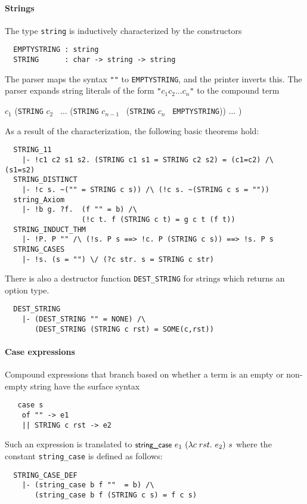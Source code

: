 \paragraph {Strings}

The type \verb+string+ is inductively characterized by the
constructors
%
{\small
\begin{verbatim}
  EMPTYSTRING : string
  STRING      : char -> string -> string
\end{verbatim}
}
%
The \HOL{} parser maps the syntax \verb+""+ to
{\small\verb+EMPTYSTRING+}, and the \HOL{} printer inverts this.
The parser expands string literals of the form \verb+"+$c_1 c_2
\ldots c_n$\verb+"+ to the compound term

\smallskip

 $c_1$ ({\small\verb+STRING+} $c_2$ \
$\ldots$ ({\small\verb+STRING+} $c_{n-1}$ \ ({\small\verb+STRING+}
$c_n$ \ {\small\verb+EMPTYSTRING+})) $\ldots$ )

\smallskip

\noindent As a result of the characterization, the following basic theorems
hold:
%
{\small
\begin{verbatim}
  STRING_11
    |- !c1 c2 s1 s2. (STRING c1 s1 = STRING c2 s2) = (c1=c2) /\ (s1=s2)
  STRING_DISTINCT
    |- !c s. ~("" = STRING c s)) /\ (!c s. ~(STRING c s = ""))
  string_Axiom
    |- !b g. ?f.  (f "" = b) /\
                  (!c t. f (STRING c t) = g c t (f t))
  STRING_INDUCT_THM
    |- !P. P "" /\ (!s. P s ==> !c. P (STRING c s)) ==> !s. P s
  STRING_CASES
    |- !s. (s = "") \/ (?c str. s = STRING c str)
\end{verbatim}
}
%
There is also a destructor function {\small\verb+DEST_STRING+} for
strings which returns an option type.
{\small
\begin{verbatim}
  DEST_STRING
    |- (DEST_STRING "" = NONE) /\
       (DEST_STRING (STRING c rst) = SOME(c,rst))
\end{verbatim}
}


\paragraph{Case expressions}

Compound \HOL{} expressions that branch based on
whether a term is an empty or non-empty string have the
surface syntax
%
{\small
\begin{verbatim}
   case s
    of "" -> e1
    || STRING c rst -> e2
\end{verbatim}
}
%
Such an expression is translated to
$\konst{string\_case}\ e_1 \ (\lambda c\; rst.\ e_2)\ s$ where the constant
{\small\verb+string_case+} is defined as follows:
%
{\small
\begin{verbatim}
  STRING_CASE_DEF
    |- (string_case b f ""  = b) /\
       (string_case b f (STRING c s) = f c s)
\end{verbatim}
}

